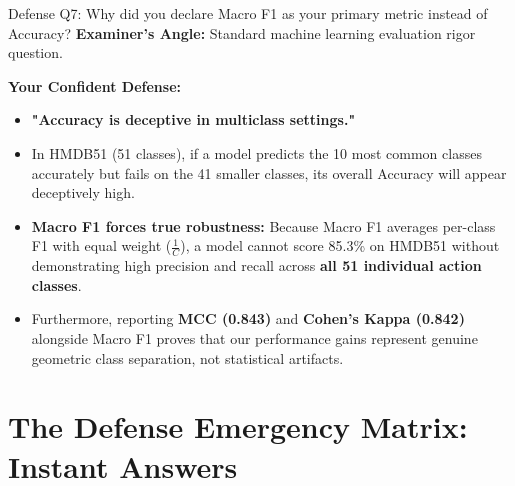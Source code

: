 \documentclass[a4paper, 11pt]{article}
\begin{document}
\begin{defensebox}{Defense Q7: Why did you declare Macro F1 as your primary metric instead of Accuracy?}
\textbf{Examiner's Angle:} Standard machine learning evaluation rigor question.

\textbf{Your Confident Defense:}
\begin{itemize}
    \item \textbf{"Accuracy is deceptive in multiclass settings."}
    \item In HMDB51 (51 classes), if a model predicts the 10 most common classes accurately but fails on the 41 smaller classes, its overall Accuracy will appear deceptively high.
    \item \textbf{Macro F1 forces true robustness:} Because Macro F1 averages per-class F1 with equal weight ($\frac{1}{C}$), a model cannot score 85.3\% on HMDB51 without demonstrating high precision and recall across \textbf{all 51 individual action classes}.
    \item Furthermore, reporting \textbf{MCC (0.843)} and \textbf{Cohen's Kappa (0.842)} alongside Macro F1 proves that our performance gains represent genuine geometric class separation, not statistical artifacts.
\end{itemize}
\end{defensebox}

\section{The Defense Emergency Matrix: Instant Answers}
\end{document}
